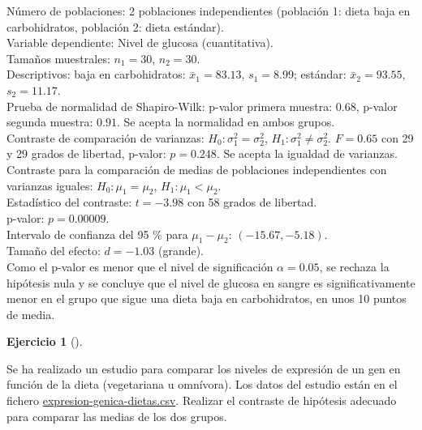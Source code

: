 \documentclass[
  spanish,
  a4paper,
]{scrreport}
\theoremstyle{definition}
\newtheorem{exercise}{Ejercicio}[chapter]
\theoremstyle{remark}
\begin{document}
\begin{tcolorbox}[enhanced jigsaw, arc=.35mm, bottomrule=.15mm, bottomtitle=1mm, breakable, colback=white, colbacktitle=quarto-callout-tip-color!10!white, colframe=quarto-callout-tip-color-frame, coltitle=black, left=2mm, leftrule=.75mm, opacityback=0, opacitybacktitle=0.6, rightrule=.15mm, title=\textcolor{quarto-callout-tip-color}{\faLightbulb}\hspace{0.5em}{Solución}, titlerule=0mm, toprule=.15mm, toptitle=1mm]

Número de poblaciones: 2 poblaciones independientes (población 1: dieta
baja en carbohidratos, población 2: dieta estándar).\\
Variable dependiente: Nivel de glucosa (cuantitativa).\\
Tamaños muestrales: \(n_1=30\), \(n_2=30\).\\
Descriptivos: baja en carbohidratos: \(\bar x_1=83.13\), \(s_1=8.99\);
estándar: \(\bar x_2=93.55\), \(s_2=11.17\).\\
Prueba de normalidad de Shapiro-Wilk: p-valor primera muestra: \(0.68\),
p-valor segunda muestra: \(0.91\). Se acepta la normalidad en ambos
grupos.\\
Contraste de comparación de varianzas: \(H_0:\sigma_1^2=\sigma_2^2\),
\(H_1:\sigma_1^2\neq \sigma_2^2\). \(F=0.65\) con 29 y 29 grados de
libertad, p-valor: \(p=0.248\). Se acepta la igualdad de varianzas.\\
Contraste para la comparación de medias de poblaciones independientes
con varianzas iguales: \(H_0:\mu_1=\mu_2\), \(H_1:\mu_1<\mu_2\).\\
Estadístico del contraste: \(t=-3.98\) con 58 grados de libertad.\\
p-valor: \(p=0.00009\).\\
Intervalo de confianza del 95 \% para \(\mu_1-\mu_2\):
\((-15.67, -5.18)\).\\
Tamaño del efecto: \(d=-1.03\) (grande).\\
Como el p-valor es menor que el nivel de significación \(\alpha=0.05\),
se rechaza la hipótesis nula y se concluye que el nivel de glucosa en
sangre es significativamente menor en el grupo que sigue una dieta baja
en carbohidratos, en unos 10 puntos de media.

\end{tcolorbox}

\begin{exercise}[]\protect\hypertarget{exr-contraste-comparacion-medias-expresion-genica}{}\label{exr-contraste-comparacion-medias-expresion-genica}

Se ha realizado un estudio para comparar los niveles de expresión de un
gen en función de la dieta (vegetariana u omnívora). Los datos del
estudio están en el fichero
\href{datos/expresion-genica-dietas.csv}{expresion-genica-dietas.csv}.
Realizar el contraste de hipótesis adecuado para comparar las medias de
los dos grupos.

\end{exercise}
\end{document}
